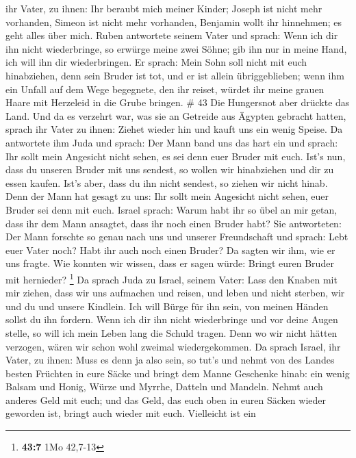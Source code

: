ihr Vater, zu ihnen: Ihr beraubt mich meiner Kinder; Joseph ist nicht
mehr vorhanden, Simeon ist nicht mehr vorhanden, Benjamin wollt ihr
hinnehmen; es geht alles über mich.  Ruben antwortete
seinem Vater und sprach: Wenn ich dir ihn nicht wiederbringe, so erwürge
meine zwei Söhne; gib ihn nur in meine Hand, ich will ihn dir
wiederbringen.  Er sprach: Mein Sohn soll nicht mit euch
hinabziehen, denn sein Bruder ist tot, und er ist allein übriggeblieben;
wenn ihm ein Unfall auf dem Wege begegnete, den ihr reiset, würdet ihr
meine grauen Haare mit Herzeleid in die Grube bringen. \# 43
 Die Hungersnot aber drückte das Land.  Und
da es verzehrt war, was sie an Getreide aus Ägypten gebracht hatten,
sprach ihr Vater zu ihnen: Ziehet wieder hin und kauft uns ein wenig
Speise.  Da antwortete ihm Juda und sprach: Der Mann band
uns das hart ein und sprach: Ihr sollt mein Angesicht nicht sehen, es
sei denn euer Bruder mit euch.  Ist's nun, dass du unseren
Bruder mit uns sendest, so wollen wir hinabziehen und dir zu essen
kaufen.  Ist's aber, dass du ihn nicht sendest, so ziehen
wir nicht hinab. Denn der Mann hat gesagt zu uns: Ihr sollt mein
Angesicht nicht sehen, euer Bruder sei denn mit euch. 
Israel sprach: Warum habt ihr so übel an mir getan, dass ihr dem Mann
ansagtet, dass ihr noch einen Bruder habt?  Sie
antworteten: Der Mann forschte so genau nach uns und unserer
Freundschaft und sprach: Lebt euer Vater noch? Habt ihr auch noch einen
Bruder? Da sagten wir ihm, wie er uns fragte. Wie konnten wir wissen,
dass er sagen würde: Bringt euren Bruder mit hernieder? \footnote{\textbf{43:7}
  1Mo 42,7-13}  Da sprach Juda zu Israel, seinem Vater:
Lass den Knaben mit mir ziehen, dass wir uns aufmachen und reisen, und
leben und nicht sterben, wir und du und unsere Kindlein. 
Ich will Bürge für ihn sein, von meinen Händen sollst du ihn fordern.
Wenn ich dir ihn nicht wiederbringe und vor deine Augen stelle, so will
ich mein Leben lang die Schuld tragen.  Denn wo wir nicht
hätten verzogen, wären wir schon wohl zweimal wiedergekommen.
 Da sprach Israel, ihr Vater, zu ihnen: Muss es denn ja
also sein, so tut's und nehmt von des Landes besten Früchten in eure
Säcke und bringt dem Manne Geschenke hinab: ein wenig Balsam und Honig,
Würze und Myrrhe, Datteln und Mandeln.  Nehmt auch
anderes Geld mit euch; und das Geld, das euch oben in euren Säcken
wieder geworden ist, bringt auch wieder mit euch. Vielleicht ist ein
